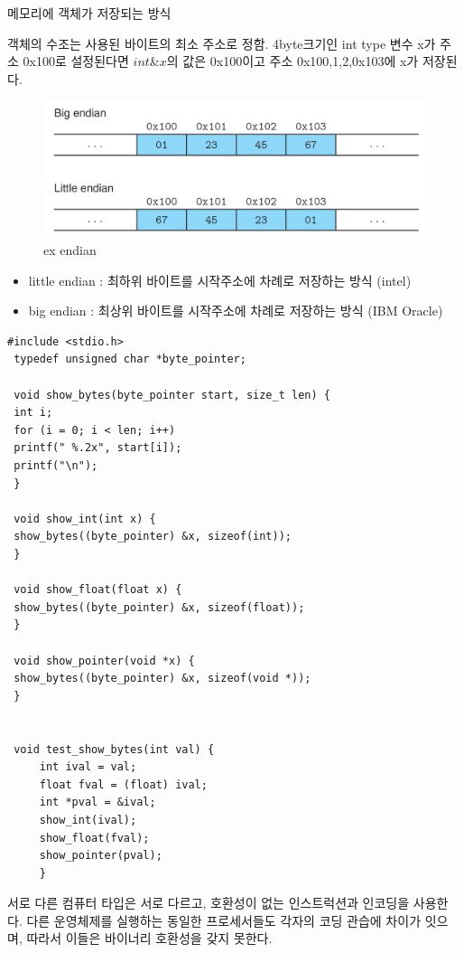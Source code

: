 메모리에 객체가 저장되는 방식

객체의 수조는 사용된 바이트의 최소 주소로 정함.
4byte크기인 int type 변수 x가 주소 0x100로 설정된다면 $int \&x$의 값은 0x100이고 주소 0x100,1,2,0x103에 x가 저장된다.






\begin{figure}[h!]
    \centering
    \includegraphics[scale=0.3]{pic/section12/pic11.png}
    \caption{ex endian}
\end{figure}


\begin{itemize}
    \item little endian :  최하위 바이트를 시작주소에 차례로 저장하는 방식 (intel)
    \item big endian : 최상위 바이트를 시작주소에 차례로 저장하는 방식 (IBM Oracle)
\end{itemize}


\begin{lstlisting}[style = CStyle]
 #include <stdio.h>
 typedef unsigned char *byte_pointer;

 void show_bytes(byte_pointer start, size_t len) {
 int i;
 for (i = 0; i < len; i++)
 printf(" %.2x", start[i]);
 printf("\n");
 }

 void show_int(int x) {
 show_bytes((byte_pointer) &x, sizeof(int));
 }

 void show_float(float x) {
 show_bytes((byte_pointer) &x, sizeof(float));
 }

 void show_pointer(void *x) {
 show_bytes((byte_pointer) &x, sizeof(void *));
 }


 void test_show_bytes(int val) {
     int ival = val;
     float fval = (float) ival;
     int *pval = &ival;
     show_int(ival);
     show_float(fval);
     show_pointer(pval);
     }

\end{lstlisting}
서로 다른 컴퓨터 타입은 서로 다르고, 호환성이 없는 인스트럭션과 인코딩을 사용한다. 다른 운영체제를 실행하는 동일한 프로세서들도 각자의 코딩 관습에 차이가 잇으며, 따라서 이들은 바이너리 호환성을 갖지 못한다.

